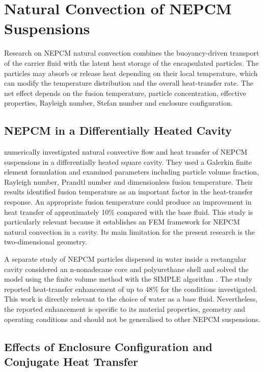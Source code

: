 \section{Natural Convection of NEPCM Suspensions}

Research on NEPCM natural convection combines the buoyancy-driven transport of the carrier fluid with the latent heat storage of the encapsulated particles. The particles may absorb or release heat depending on their local temperature, which can modify the temperature distribution and the overall heat-transfer rate. The net effect depends on the fusion temperature, particle concentration, effective properties, Rayleigh number, Stefan number and enclosure configuration.

\subsection{NEPCM in a Differentially Heated Cavity}

\citet{ghalambaz2019} numerically investigated natural convective flow and heat transfer of NEPCM suspensions in a differentially heated square cavity. They used a Galerkin finite element formulation and examined parameters including particle volume fraction, Rayleigh number, Prandtl number and dimensionless fusion temperature. Their results identified fusion temperature as an important factor in the heat-transfer response. An appropriate fusion temperature could produce an improvement in heat transfer of approximately 10\% compared with the base fluid. This study is particularly relevant because it establishes an FEM framework for NEPCM natural convection in a cavity. Its main limitation for the present research is the two-dimensional geometry.

A separate study of NEPCM particles dispersed in water inside a rectangular cavity considered an n-nonadecane core and polyurethane shell and solved the model using the finite volume method with the SIMPLE algorithm \citep{golab2021}. The study reported heat-transfer enhancement of up to 48\% for the conditions investigated. This work is directly relevant to the choice of water as a base fluid. Nevertheless, the reported enhancement is specific to its material properties, geometry and operating conditions and should not be generalised to other NEPCM suspensions.

\subsection{Effects of Enclosure Configuration and Conjugate Heat Transfer}

